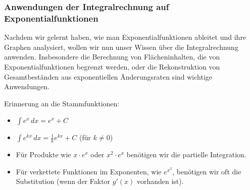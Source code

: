 \subsubsection{Anwendungen der Integralrechnung auf Exponentialfunktionen}
\label{subsubsec:exp_integration_anwendungen}

Nachdem wir gelernt haben, wie man Exponentialfunktionen ableitet und ihre Graphen analysiert, wollen wir nun unser Wissen über die Integralrechnung anwenden. Insbesondere die Berechnung von Flächeninhalten, die von Exponentialfunktionen begrenzt werden, oder die Rekonstruktion von Gesamtbeständen aus exponentiellen Änderungsraten sind wichtige Anwendungen.

Erinnerung an die Stammfunktionen:
\begin{itemize}
    \item $\int e^x \,dx = e^x + C$
    \item $\int e^{kx} \,dx = \frac{1}{k} e^{kx} + C$ (für $k \neq 0$)
    \item Für Produkte wie $x \cdot e^x$ oder $x^2 \cdot e^x$ benötigen wir die partielle Integration.
    \item Für verkettete Funktionen im Exponenten, wie $e^{x^2}$, benötigen wir oft die Substitution (wenn der Faktor $g'(x)$ vorhanden ist).
\end{itemize}

